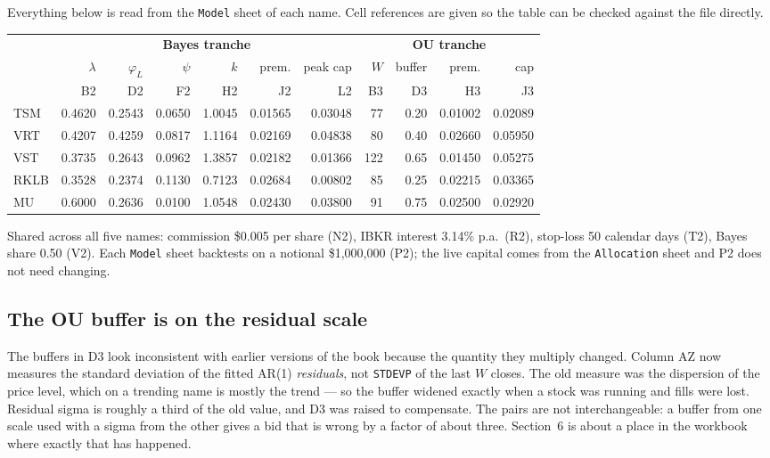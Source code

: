 \documentclass[11pt]{article}
\begin{document}
Everything below is read from the \texttt{Model} sheet of each name. Cell references are given so
the table can be checked against the file directly.

\vspace{0.4em}
\begin{center}
\footnotesize
\begin{tabular}{@{}l r r r r r r r r r r@{}}
\toprule
& \multicolumn{6}{c}{\textbf{Bayes tranche}} & \multicolumn{4}{c}{\textbf{OU tranche}} \\
\cmidrule(lr){2-7}\cmidrule(lr){8-11}
& $\lambda$ & $\varphi_L$ & $\psi$ & $k$ & prem. & peak cap & $W$ & buffer & prem. & cap \\
& \tiny B2 & \tiny D2 & \tiny F2 & \tiny H2 & \tiny J2 & \tiny L2 & \tiny B3 & \tiny D3 & \tiny H3 & \tiny J3 \\
\midrule
TSM  & 0.4620 & 0.2543 & 0.0650 & 1.0045 & 0.01565 & 0.03048 & 77  & 0.20 & 0.01002 & 0.02089 \\
VRT  & 0.4207 & 0.4259 & 0.0817 & 1.1164 & 0.02169 & 0.04838 & 80  & 0.40 & 0.02660 & 0.05950 \\
VST  & 0.3735 & 0.2643 & 0.0962 & 1.3857 & 0.02182 & 0.01366 & 122 & 0.65 & 0.01450 & 0.05275 \\
RKLB & 0.3528 & 0.2374 & 0.1130 & 0.7123 & 0.02684 & 0.00802 & 85  & 0.25 & 0.02215 & 0.03365 \\
MU   & 0.6000 & 0.2636 & 0.0100 & 1.0548 & 0.02430 & 0.03800 & 91  & 0.75 & 0.02500 & 0.02920 \\
\bottomrule
\end{tabular}
\end{center}

Shared across all five names: commission \$0.005 per share (N2), IBKR interest 3.14\% p.a.\ (R2),
stop-loss 50 calendar days (T2), Bayes share 0.50 (V2). Each \texttt{Model} sheet backtests on a
notional \$1{,}000{,}000 (P2); the live capital comes from the \texttt{Allocation} sheet and P2
does not need changing.

\subsection{The OU buffer is on the residual scale}

The buffers in D3 look inconsistent with earlier versions of the book because the quantity they
multiply changed. Column AZ now measures the standard deviation of the fitted AR(1)
\emph{residuals}, not \texttt{STDEVP} of the last $W$ closes. The old measure was the dispersion
of the price level, which on a trending name is mostly the trend --- so the buffer widened
exactly when a stock was running and fills were lost. Residual sigma is roughly a third of the
old value, and D3 was raised to compensate. The pairs are not interchangeable: a buffer from one
scale used with a sigma from the other gives a bid that is wrong by a factor of about three.
Section~6 is about a place in the workbook where exactly that has happened.
\end{document}
